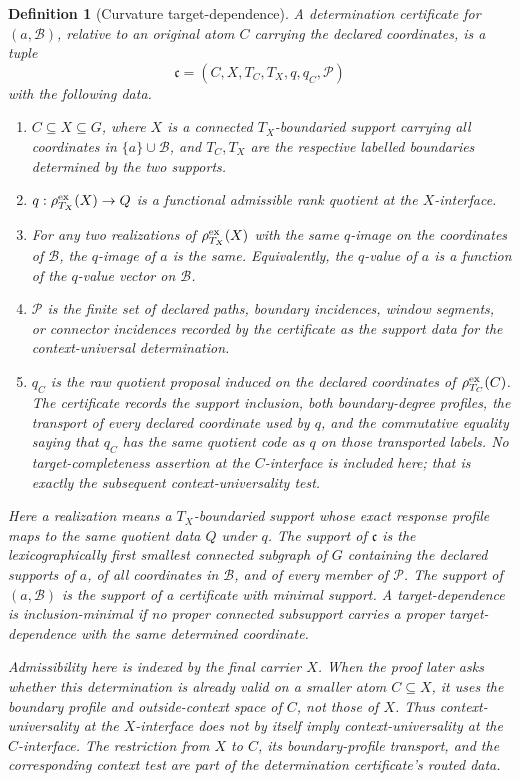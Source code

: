 \documentclass[11pt]{article}
\newtheorem{definition}[theorem]{Definition}
\begin{document}
\begin{definition}[Curvature target-dependence]
A \emph{determination certificate} for \((a,\mathcal B)\), relative to an
original atom \(C\) carrying the declared coordinates, is a tuple
\[
\mathfrak c=(C,X,T_C,T_X,q,q_C,\mathcal P)
\]
with the following data.
\begin{enumerate}[label=(\alph*), leftmargin=2.2em]
\item \(C\subseteq X\subseteq G\), where \(X\) is a connected
\(T_X\)-boundaried support carrying all coordinates in
\(\{a\}\cup\mathcal B\), and \(T_C,T_X\) are the respective labelled
boundaries determined by the two supports.
\item \(q:\rho_{T_X}^{\rm ex}(X)\to Q\) is a functional admissible rank
quotient at the \(X\)-interface.
\item For any two realizations of \(\rho_{T_X}^{\rm ex}(X)\) with the same
\(q\)-image on the coordinates of \(\mathcal B\), the \(q\)-image of \(a\) is
the same.  Equivalently, the \(q\)-value of \(a\) is a function of the
\(q\)-value vector on \(\mathcal B\).
\item \(\mathcal P\) is the finite set of declared paths, boundary incidences,
window segments, or connector incidences recorded by the certificate as the
support data for the context-universal determination.
\item \(q_C\) is the raw quotient proposal induced on the declared
coordinates of \(\rho_{T_C}^{\rm ex}(C)\).  The certificate records the
support inclusion, both boundary-degree profiles, the transport of every
declared coordinate used by \(q\), and the commutative equality saying that
\(q_C\) has the same quotient code as \(q\) on those transported labels.
No target-completeness assertion at the \(C\)-interface is included here; that
is exactly the subsequent context-universality test.
\end{enumerate}
Here a realization means a \(T_X\)-boundaried support whose exact response profile
maps to the same quotient data \(Q\) under \(q\).  The \emph{support} of
\(\mathfrak c\) is the lexicographically first smallest connected subgraph of
\(G\) containing the declared supports of \(a\), of all coordinates in
\(\mathcal B\), and of every member of \(\mathcal P\).  The support of
\((a,\mathcal B)\) is the support of a certificate with minimal support.  A
target-dependence is \emph{inclusion-minimal} if no proper connected subsupport
carries a proper target-dependence with the same determined coordinate.

Admissibility here is indexed by the final carrier \(X\).  When the proof later
asks whether this determination is already valid on a smaller atom
\(C\subseteq X\), it uses the boundary profile and outside-context space of
\(C\), not those of \(X\).  Thus context-universality at the \(X\)-interface
does not by itself imply context-universality at the \(C\)-interface.  The
restriction from \(X\) to \(C\), its boundary-profile transport, and the
corresponding context test are part of the determination certificate's routed
data.
\end{definition}
\end{document}
